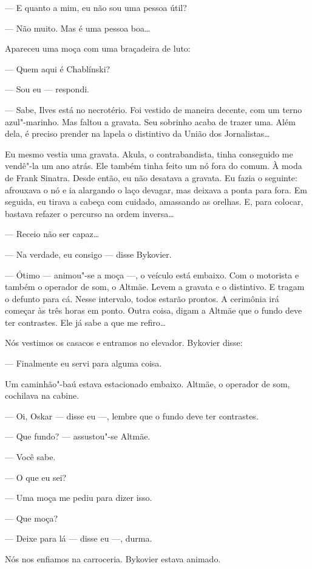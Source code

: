 --- E quanto a mim, eu não sou uma pessoa útil?

--- Não muito. Mas é uma pessoa boa\ldots{}

Apareceu uma moça com uma braçadeira de luto:

--- Quem aqui é Chablínski?

--- Sou eu --- respondi.

--- Sabe, Ilves está no necrotério. Foi vestido de maneira decente, com
um terno azul"-marinho. Mas faltou a gravata. Seu sobrinho acaba de
trazer uma. Além dela, é preciso prender na lapela o distintivo da União
dos Jornalistas\ldots{}

Eu mesmo vestia uma gravata. Akula, o contrabandista, tinha conseguido
me vendê"-la um ano atrás. Ele também tinha feito um nó fora do comum. À
moda de Frank Sinatra. Desde então, eu não desatava a gravata. Eu fazia
o seguinte: afrouxava o nó e ia alargando o laço devagar, mas deixava a
ponta para fora. Em seguida, eu tirava a cabeça com cuidado, amassando
as orelhas. E, para colocar, bastava refazer o percurso na ordem
inversa\ldots{}

--- Receio não ser capaz\ldots{}

--- Na verdade, eu consigo --- disse Bykovier.

--- Ótimo --- animou"-se a moça ---, o veículo está embaixo. Com o
motorista e também o operador de som, o Altmäe. Levem a gravata e o
distintivo. E tragam o defunto para cá. Nesse intervalo, todos estarão
prontos. A cerimônia irá começar às três horas em ponto. Outra coisa,
digam a Altmäe que o fundo deve ter contrastes. Ele já sabe a que me
refiro\ldots{}

Nós vestimos os casacos e entramos no elevador. Bykovier disse:

--- Finalmente eu servi para alguma coisa.

Um caminhão"-baú estava estacionado embaixo. Altmäe, o
operador de som, cochilava na cabine.

--- Oi, Oskar --- disse eu ---, lembre que o fundo deve ter contrastes.

--- Que fundo? --- assustou"-se Altmäe.

--- Você sabe.

--- O que eu sei?

--- Uma moça me pediu para dizer isso.

--- Que moça?

--- Deixe para lá --- disse eu ---, durma.

Nós nos enfiamos na carroceria. Bykovier estava animado.

